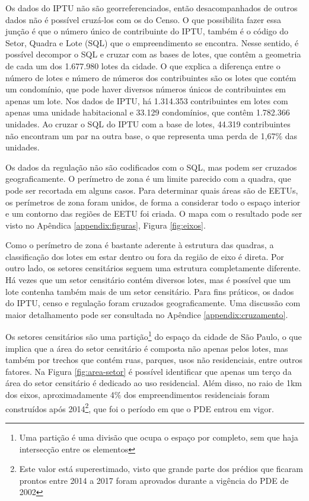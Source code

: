 

Os dados do IPTU não são georreferenciados, então desacompanhados de outros dados não é possível cruzá-los com os do Censo. O que possibilita fazer essa junção é que o número único de contribuinte do IPTU, também é o código do Setor, Quadra e Lote (SQL) que o empreendimento se encontra. Nesse sentido, é possível decompor o SQL e cruzar com as bases de lotes, que contêm a geometria de cada  um dos 1.677.980 lotes da cidade. O que explica a diferença entre o número de lotes e número de números dos contribuintes são os lotes que contém um condomínio, que pode haver diversos números únicos de contribuintes em apenas um lote. Nos dados de IPTU, há 1.314.353 contribuintes em lotes com apenas uma unidade habitacional e 33.129 condomínios, que contêm 1.782.366 unidades. Ao cruzar o SQL do IPTU com a base de lotes, 44.319 contribuintes não encontram um par na outra base, o que representa uma perda de 1,67\% das unidades. 

Os dados da regulação não são codificados com o SQL, mas podem ser cruzados geograficamente. O perímetro de zona é um limite parecido com a quadra, que pode ser recortada em alguns casos. Para determinar quais áreas são de EETUs, os perímetros de zona foram unidos, de forma a considerar todo o espaço interior e um contorno das regiões de EETU foi criada. O mapa com o resultado pode ser visto no Apêndica \ref{appendix:figuras}, Figura \ref{fig:eixos}. 

Como o perímetro de zona é bastante aderente à estrutura das quadras, a classificação dos lotes em estar dentro ou fora da região de eixo é direta. Por outro lado, os setores censitários seguem uma estrutura completamente diferente. Há vezes que um setor censitário contém diversos lotes, mas é possível que um lote contenha também mais de um setor censitário. Para fins práticos, os dados do IPTU, censo e regulação foram cruzados geograficamente. Uma discussão com maior detalhamento pode ser consultada no Apêndice \ref{appendix:cruzamento}.

Os setores censitários são uma partição\footnote{Uma partição é uma divisão que ocupa o espaço por completo, sem que haja intersecção entre os elementos} do espaço da cidade de São Paulo, o que implica que a área do setor censitário é composta não apenas pelos lotes, mas também por trechos que contém ruas, parques, usos não residenciais, entre outros fatores. Na Figura \ref{fig:area-setor} é possível identificar que apenas um terço da área do setor censitário é dedicado ao uso residencial. Além disso, no raio de 1km dos eixos, aproximadamente 4\% dos empreendimentos residenciais foram construídos após 2014\footnote{Este valor está superestimado, visto que grande parte dos prédios que ficaram prontos entre 2014 a 2017 foram aprovados durante a vigência do PDE de 2002}, que foi o período em que o PDE entrou em vigor. 
 
